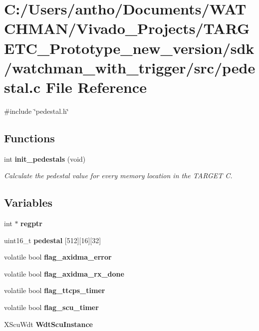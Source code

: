 \section{C\+:/\+Users/antho/\+Documents/\+W\+A\+T\+C\+H\+M\+A\+N/\+Vivado\+\_\+\+Projects/\+T\+A\+R\+G\+E\+T\+C\+\_\+\+Prototype\+\_\+new\+\_\+version/sdk/watchman\+\_\+with\+\_\+trigger/src/pedestal.c File Reference}
\label{pedestal_8c}
{\ttfamily \#include \char`\"{}pedestal.\+h\char`\"{}}\newline
\subsection*{Functions}
\begin{DoxyCompactItemize}
\item 
int \textbf{ init\+\_\+pedestals} (void)
\begin{DoxyCompactList}\small\item\em Calculate the pedestal value for every memory location in the T\+A\+R\+G\+ET C. \end{DoxyCompactList}\end{DoxyCompactItemize}
\subsection*{Variables}
\begin{DoxyCompactItemize}
\item 
\mbox{\label{pedestal_8c_a39d2cad95814eb9635cca5310d914893}} 
int $\ast$ {\bfseries regptr}
\item 
\mbox{\label{pedestal_8c_a9f38c959b992d18ac787045dc9d4a7ab}} 
uint16\+\_\+t {\bfseries pedestal} [512][16][32]
\item 
\mbox{\label{pedestal_8c_a226727c48b3bfd0888096614ee551f89}} 
volatile bool {\bfseries flag\+\_\+axidma\+\_\+error}
\item 
\mbox{\label{pedestal_8c_af3d0d90fb2e8215cab44c4a6c6c268fc}} 
volatile bool {\bfseries flag\+\_\+axidma\+\_\+rx\+\_\+done}
\item 
\mbox{\label{pedestal_8c_ae1142987fecfa0c02e7edfb9f539805b}} 
volatile bool {\bfseries flag\+\_\+ttcps\+\_\+timer}
\item 
\mbox{\label{pedestal_8c_a92815e63a8bb041c9594c7229d49cd89}} 
volatile bool {\bfseries flag\+\_\+scu\+\_\+timer}
\item 
\mbox{\label{pedestal_8c_afd1f6e74a3d4d317436684e7fa64a8fa}} 
X\+Scu\+Wdt {\bfseries Wdt\+Scu\+Instance}
\end{DoxyCompactItemize}


